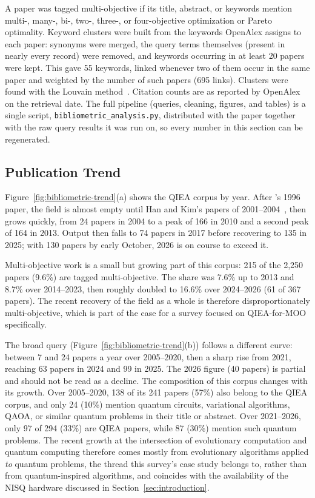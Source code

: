 A paper was tagged multi-objective if its title, abstract, or keywords
mention multi-, many-, bi-, two-, three-, or four-objective
optimization or Pareto optimality. Keyword clusters were built from
the keywords OpenAlex assigns to each paper: synonyms were merged, the
query terms themselves (present in nearly every record) were removed,
and keywords occurring in at least 20 papers were kept. This gave 55
keywords, linked whenever two of them occur in the same paper and
weighted by the number of such papers (695 links). Clusters were
found with the Louvain method~\citep{blondel2008louvain}. Citation
counts are as reported by OpenAlex on the retrieval date. The full
pipeline (queries, cleaning, figures, and tables) is a single script,
\texttt{bibliometric\_analysis.py}, distributed with the paper together
with the raw query results it was run on, so every number in this
section can be regenerated.

\subsection{Publication Trend}
\label{sec:bibliometric:trend}

Figure~\ref{fig:bibliometric-trend}(a) shows the QIEA corpus by year.
After \citet{narayanan1996qiga}'s 1996 paper, the field is almost empty
until Han and Kim's papers of 2001--2004~\citep{han2001pqga,han2002qea,han2004hepsilon},
then grows quickly, from 24 papers in 2004 to a peak of 166 in 2010
and a second peak of 164 in 2013. Output then falls to 74 papers in
2017 before recovering to 135 in 2025; with 130 papers by early October,
2026 is on course to exceed it.

Multi-objective work is a small but growing part of this corpus: 215 of
the 2{,}250 papers (9.6\%) are tagged multi-objective. The share was
7.6\% up to 2013 and 8.7\% over 2014--2023, then roughly doubled to
16.6\% over 2024--2026 (61 of 367 papers). The recent recovery of the
field as a whole is therefore disproportionately multi-objective, which
is part of the case for a survey focused on QIEA-for-MOO specifically.

The broad query (Figure~\ref{fig:bibliometric-trend}(b)) follows a
different curve: between 7 and 24 papers a year over 2005--2020, then a
sharp rise from 2021, reaching 63 papers in 2024 and 99 in 2025. The 2026
figure (40 papers) is partial and should not be read as a decline. The
composition of this corpus changes with its growth. Over 2005--2020,
138 of its 241 papers (57\%) also belong to the QIEA corpus, and only 24
(10\%) mention quantum circuits, variational algorithms, QAOA, or
similar quantum problems in their title or abstract. Over 2021--2026,
only 97 of 294 (33\%) are QIEA papers, while 87 (30\%) mention such
quantum problems. The recent growth at the intersection of evolutionary
computation and quantum computing therefore comes mostly from
evolutionary algorithms applied \emph{to} quantum problems, the thread
this survey's case study belongs to, rather than from quantum-inspired
algorithms, and coincides with the availability of the NISQ hardware
discussed in Section~\ref{sec:introduction}.

